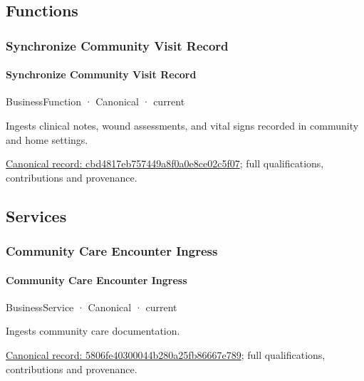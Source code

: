\subsection{Functions}

\subsubsection{Synchronize Community Visit Record}

\paragraph{Synchronize Community Visit Record}

\label{element:cbd4817eb757449a8f0a0e8ce02c5f07}
{\small BusinessFunction · Canonical · current}\par

Ingests clinical notes, wound assessments, and vital signs recorded in community and home settings.


{\footnotesize \href{../../../../continuum/business/business-function/cbd4817eb757449a8f0a0e8ce02c5f07.md}{Canonical record: cbd4817eb757449a8f0a0e8ce02c5f07}; full qualifications, contributions and provenance.}\par
\subsection{Services}

\subsubsection{Community Care Encounter Ingress}

\paragraph{Community Care Encounter Ingress}

\label{element:5806fe40300044b280a25fb86667e789}
{\small BusinessService · Canonical · current}\par

Ingests community care documentation.


{\footnotesize \href{../../../../continuum/business/business-service/5806fe40300044b280a25fb86667e789.md}{Canonical record: 5806fe40300044b280a25fb86667e789}; full qualifications, contributions and provenance.}\par
